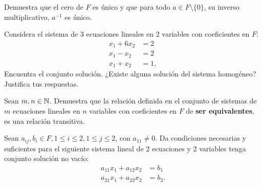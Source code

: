 \documentclass[12pt,a4paper]{book}
\begin{document}
    \begin{ejercicio}
        Demuestra que el cero de $F$ es único y que para todo $a \in F \setminus \{ 0 \}$, su inverso multiplicativo, $a^{-1}$ es único.
    \end{ejercicio}

    \begin{ejercicio}
        Considera el sistema de $3$ ecuaciones lineales en $2$ variables con coeficientes en $F$:
        \begin{align}
            x_1 + 6x_2 & = 2 \tag{2.1}\\
            x_1 - x_2 & = 2 \tag{2.2}\\
            x_1 + x_2 & = 1 \tag{2.3},
        \end{align}
        Encuentra el conjunto solución. ¿Existe alguna solución del sistema homogéneo? Justifica tus respuestas.
    \end{ejercicio}

    \begin{ejercicio}
        Sean $m,n \in \mathbb{N}$. Demuestra que la relación definida en el conjunto de sistemas de $m$ ecuaciones lineales en $n$ variables con coeficientes en $F$ de \textbf{ser equivalentes}, es una relación transitiva.
    \end{ejercicio}

    \begin{ejercicio}
        Sean $a_{ij}, b_i \in F, 1 \leq i \leq 2, 1 \leq j \leq 2$, con $a_{11} \neq 0$. Da condiciones necesarias y suficientes para el siguiente sistema lineal de 2 ecuaciones y 2 variables tenga conjunto solución no vacío:
        \begin{align}
            a_{11}x_{1} + a_{12}x_{2} & = b_{1} \\
            a_{21}x_{1} + a_{22}x_{2} & = b_{2}.
        \end{align}
    \end{ejercicio}

    \vspace{2cm}
\end{document}
